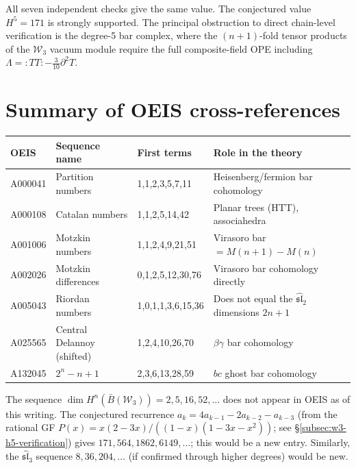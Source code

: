 \noindent
All seven independent checks give the same value.
The conjectured value $H^5 = 171$ is strongly supported.
The principal obstruction to direct chain-level verification is the
degree-5 bar complex, where the $(n+1)$-fold tensor products of the
$\mathcal{W}_3$ vacuum module require the full composite-field OPE
including $\Lambda = {:}TT{:} - \tfrac{3}{10}\partial^2 T$.

\section{Summary of OEIS cross-references}
\label{sec:oeis}

\begin{center}
\renewcommand{\arraystretch}{1.4}
\begin{tabular}{lllp{5.5cm}}
\toprule
\textbf{OEIS} & \textbf{Sequence name} & \textbf{First terms} & \textbf{Role in the theory} \\
\midrule
A000041 & Partition numbers & 1,1,2,3,5,7,11 & Heisenberg/fermion bar cohomology \\
A000108 & Catalan numbers & 1,1,2,5,14,42 & Planar trees (HTT), associahedra \\
A001006 & Motzkin numbers & 1,1,2,4,9,21,51 & Virasoro bar $= M(n{+}1) - M(n)$ \\
A002026 & Motzkin differences & 0,1,2,5,12,30,76 & Virasoro bar cohomology directly \\
A005043 & Riordan numbers & 1,0,1,1,3,6,15,36 & Does not equal the $\widehat{\mathfrak{sl}}_2$ dimensions $2n{+}1$ \\
A025565 & Central Delannoy (shifted) & 1,2,4,10,26,70 & $\beta\gamma$ bar cohomology \\
A132045 & $2^n - n + 1$ & 2,3,6,13,28,59 & $bc$ ghost bar cohomology \\
\bottomrule
\end{tabular}
\end{center}

\medskip

\noindent
The sequence $\dim H^n(\bar{B}(\mathcal{W}_3)) = 2, 5, 16, 52, \ldots$ does not appear in OEIS as of this writing. The conjectured recurrence $a_k = 4a_{k-1} - 2a_{k-2} - a_{k-3}$ (from the rational GF $P(x) = x(2-3x)/((1-x)(1-3x-x^2))$; see \S\ref{subsec:w3-h5-verification}) gives $171, 564, 1862, 6149, \ldots$; this would be a new entry. Similarly, the $\widehat{\mathfrak{sl}}_3$ sequence $8, 36, 204, \ldots$ (if confirmed through higher degrees) would be new.

